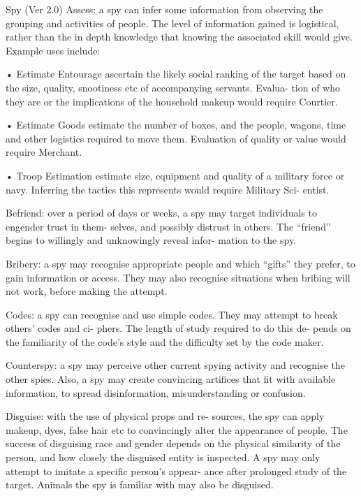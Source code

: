 \begin{Chapter}{Spy (Ver 2.0)}
Assess:  a  spy  can  infer  some  information  from 
observing  the  grouping  and  activities  of  people. 
The level of information gained is logistical, rather 
than  the  in  depth  knowledge  that  knowing  the 
associated skill would give. Example uses include:  

•  Estimate  Entourage  ascertain  the  likely  social 
ranking  of  the  target  based  on  the  size,  quality, 
snootiness  etc  of  accompanying  servants.  Evalua-
tion  of  who  they  are  or  the  implications  of  the 
household makeup would require Courtier.  

•  Estimate  Goods  estimate  the  number  of  boxes, 
and  the  people,  wagons,  time  and  other  logistics 
required  to  move  them.  Evaluation  of  quality  or 
value would require Merchant.  

•  Troop  Estimation  estimate  size,  equipment  and 
quality  of  a  military  force  or  navy.  Inferring  the 
tactics  this  represents  would  require  Military  Sci-
entist. 

Befriend:  over  a  period  of  days  or  weeks,  a  spy 
may  target  individuals  to  engender  trust  in  them-
selves, and possibly distrust in others. The “friend” 
begins  to  willingly  and  unknowingly  reveal  infor-
mation to the spy. 

Bribery:  a  spy  may  recognise  appropriate  people 
and  which  “gifts”  they  prefer,  to  gain  information 
or access. They may also recognise situations when 
bribing will not work, before making the attempt. 

Codes:  a  spy  can  recognise  and  use  simple  codes. 
They  may  attempt  to  break  others’  codes  and  ci-
phers.  The  length  of  study  required  to  do  this  de-
pends on the familiarity of the code’s style and the 
difficulty set by the code maker. 

Counterspy:  a  spy  may  perceive  other  current 
spying activity and recognise the other spies. Also, 
a  spy  may  create  convincing  artifices  that  fit  with 
available  information,  to  spread  disinformation, 
misunderstanding or confusion. 

Disguise:  with  the  use  of  physical  props  and  re-
sources, the spy can apply makeup, dyes, false hair 
etc to convincingly alter the appearance of people. 
The success of disguising race and gender depends 
on  the  physical  similarity  of  the  person,  and  how 
closely the disguised entity is inspected. A spy may 
only  attempt  to imitate  a  specific  person’s  appear-
ance  after  prolonged  study  of  the  target.  Animals 
the spy is familiar with may also be disguised. 


\end{Chapter}
